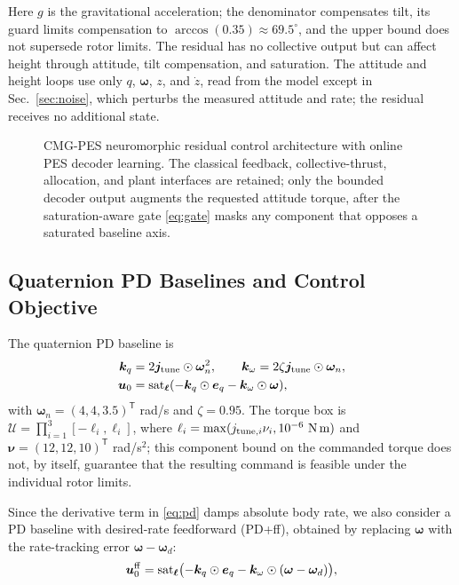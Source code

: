 \documentclass[letterpaper, 10 pt, conference]{ieeeconf}
\newcommand{\T}{^{\mathsf T}}
\newcommand{\sat}{\operatorname{sat}}
\begin{document}
Here $g$ is the gravitational acceleration; the denominator compensates tilt, its guard limits compensation to $\arccos(0.35)\approx69.5^\circ$, and the upper bound does
not supersede rotor limits. The residual has no collective
output but can affect height through attitude, tilt compensation, and
saturation. The attitude and height loops use only $q$, $\bm\omega$, $z$, and $\dot z$, read from the model except in Sec.~\ref{sec:noise}, which perturbs the measured attitude and rate; the residual receives no additional state.

\begin{figure}[!th]
    \centering
    \resizebox{0.84\textwidth}{!}{}
    \caption{CMG-PES neuromorphic residual control architecture with online PES decoder learning. The classical feedback, collective-thrust, allocation, and plant interfaces are retained; only the bounded decoder output augments the requested attitude torque, after the saturation-aware gate \eqref{eq:gate} masks any component that opposes a saturated baseline axis.}
    \label{fig:arch}
\end{figure}

\subsection{Quaternion PD Baselines and Control Objective}

The quaternion PD baseline is
\begin{align}
 \bm k_q&=2\bm j_{\rm tune}\odot\bm\omega_n^2,\qquad
 \bm k_\omega=2\zeta\bm j_{\rm tune}\odot\bm\omega_n,\\
 \bm u_0&=\sat_{\bm\ell}(-\bm k_q\odot\bm e_q-\bm k_\omega\odot\bm\omega),
 \label{eq:pd}
\end{align}
with $\bm\omega_n=(4,4,3.5)\T$ rad/s and $\zeta=0.95$. The torque box is
$\mathcal U=\prod_{i=1}^3[-\ell_i,\ell_i]$, where
$\ell_i=\max(j_{{\rm tune},i}\nu_i,10^{-6}\ \mathrm{N\,m})$ and
$\bm\nu=(12,12,10)\T$ rad/s$^2$; this component bound on the commanded torque does not, by itself, guarantee that the resulting command is feasible under the individual rotor limits.

Since the derivative term in \eqref{eq:pd} damps absolute body rate,
we also consider a PD baseline with desired-rate feedforward (PD+ff),
obtained by replacing $\bm\omega$ with the rate-tracking error
$\bm\omega-\bm\omega_d$:
\begin{equation}
 \bm u_0^{\rm ff}=\sat_{\bm\ell}\bigl(-\bm k_q\odot\bm e_q-\bm k_\omega\odot(\bm\omega-\bm\omega_d)\bigr),
 \label{eq:pdff}
\end{equation}
\end{document}
